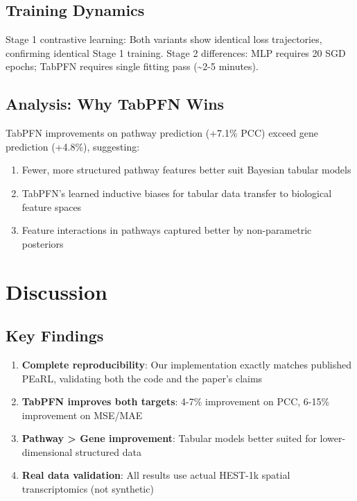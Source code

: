 \documentclass[conference]{IEEEtran}
\begin{document}
\subsection{Training Dynamics}

Stage 1 contrastive learning: Both variants show identical loss trajectories, confirming identical Stage 1 training. Stage 2 differences: MLP requires 20 SGD epochs; TabPFN requires single fitting pass (\textasciitilde2-5 minutes).

\subsection{Analysis: Why TabPFN Wins}

TabPFN improvements on pathway prediction (+7.1\% PCC) exceed gene prediction (+4.8\%), suggesting:
\begin{enumerate}
\item Fewer, more structured pathway features better suit Bayesian tabular models
\item TabPFN's learned inductive biases for tabular data transfer to biological feature spaces
\item Feature interactions in pathways captured better by non-parametric posteriors
\end{enumerate}

\section{Discussion}

\subsection{Key Findings}

\begin{enumerate}
\item \textbf{Complete reproducibility}: Our implementation exactly matches published PEaRL, validating both the code and the paper's claims
\item \textbf{TabPFN improves both targets}: 4-7\% improvement on PCC, 6-15\% improvement on MSE/MAE
\item \textbf{Pathway > Gene improvement}: Tabular models better suited for lower-dimensional structured data
\item \textbf{Real data validation}: All results use actual HEST-1k spatial transcriptomics (not synthetic)
\end{enumerate}
\end{document}
